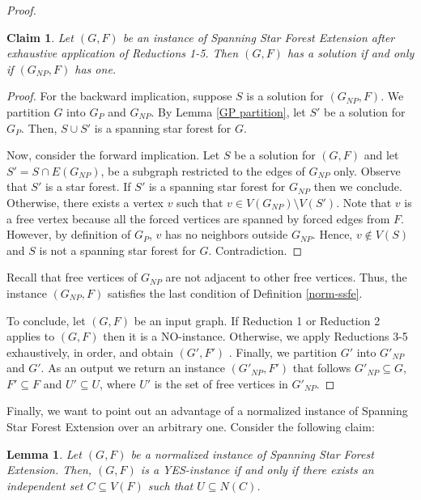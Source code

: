 \documentclass[en]{pracamgr}
\newtheorem{lemma}{Lemma}
\newtheorem{claim}{Claim}
\theoremstyle{definition}
\newcommand{\ssf}{spanning star forest}
\newcommand{\ssfep}{{\sc Spanning Star Forest Extension}}
\begin{document}
\begin{proof}
	\begin{claim}\label{GNP partition}
		Let $(G,F)$ be an instance of \ssfep{} after exhaustive application of Reductions 1-5. Then $(G,F)$ has a solution if and only if $(G_{NP},F)$ has one.
	\end{claim}

	\begin{proof}
		For the backward implication, suppose $S$ is a solution for $(G_{NP},F)$. We  partition $G$ into $G_P$ and $G_{NP}$. By Lemma \ref{GP partition}, let $S'$ be a solution for $G_P$. Then, $S \cup S'$ is a \ssf{} for $G$.
		
		Now, consider the forward implication. Let $S$ be a solution for $(G, F)$ and let $S' = S \cap E(G_{NP})$, be a subgraph restricted to the edges of $G_{NP}$ only. Observe that $S'$ is a star forest. If $S'$ is a spanning star forest for $G_{NP}$ then we conclude. Otherwise, there exists a vertex $v$ such that $v \in V(G_{NP}) \setminus V(S')$. Note that $v$ is a free vertex because all the forced vertices are spanned by forced edges from $F$. However, by definition of $G_P$, $v$ has no neighbors outside $G_{NP}$. Hence, $v \notin V(S)$ and $S$ is not a spanning star forest for $G$. Contradiction.
	\end{proof}

	Recall that free vertices of $G_{NP}$ are not adjacent to other free vertices. Thus, the instance $(G_{NP},F)$ satisfies the last condition of Definition \ref{norm-ssfe}.

	To conclude, let $(G,F)$ be an input graph. If Reduction 1 or Reduction 2 applies to $(G,F)$ then it is a NO-instance. Otherwise, we apply Reductions 3-5 exhaustively, in order, and obtain $(G',F')$ . Finally, we partition $G'$ into $G'_{NP}$ and $G'$. As an output we return an instance $(G'_{NP},F')$ that follows $G'_{NP} \subseteq G$, $F' \subseteq F$ and $U' \subseteq U$, where $U'$ is the set of free vertices in $G'_{NP}$. \qedhere

\end{proof}

Finally, we want to point out an advantage of a normalized instance of \ssfep{} over an arbitrary one. Consider the following claim:

\begin{lemma}\label{span-lemma}
	Let $(G,F)$ be a normalized instance of \ssfep{}. Then, $(G,F)$ is a YES-instance if and only if there exists an independent set $C \subseteq V(F)$ such that $U \subseteq N(C)$.
\end{lemma}
\end{document}
